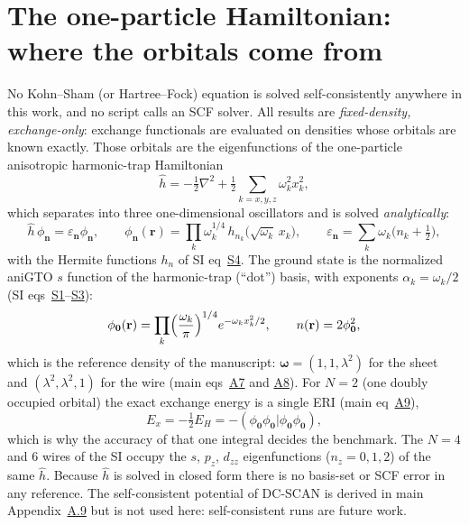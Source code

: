 \documentclass[11pt]{article}
\begin{document}
\section{The one-particle Hamiltonian: where the orbitals come from}
\label{n:sec:hamiltonian}
No Kohn--Sham (or Hartree--Fock) equation is solved self-consistently anywhere in this work, and no
script calls an SCF solver.  All results are \emph{fixed-density, exchange-only}: exchange functionals are
evaluated on densities whose orbitals are known exactly.  Those orbitals are the eigenfunctions of the
one-particle anisotropic harmonic-trap Hamiltonian
\begin{equation}
\hat h=-\tfrac12\nabla^2+\tfrac12\sum_{k=x,y,z}\omega_k^2x_k^2 ,
\label{n:h}
\end{equation}
which separates into three one-dimensional oscillators and is solved \emph{analytically}:
\begin{equation}
\hat h\,\phi_{\mathbf n}=\varepsilon_{\mathbf n}\phi_{\mathbf n},\qquad
\phi_{\mathbf n}(\mathbf r)=\prod_k\omega_k^{1/4}\,h_{n_k}\!\bigl(\sqrt{\omega_k}\,x_k\bigr),\qquad
\varepsilon_{\mathbf n}=\sum_k\omega_k\bigl(n_k+\tfrac12\bigr),
\label{n:h-eig}
\end{equation}
with the Hermite functions $h_n$ of SI eq~\href{si.pdf\#equation.4}{S4}.  The ground state is the normalized aniGTO
$s$ function of the harmonic-trap (``dot'') basis, with exponents $\alpha_k=\omega_k/2$ (SI
eqs~\href{si.pdf\#equation.1}{S1}--\href{si.pdf\#equation.3}{S3}):
\begin{equation}
\phi_{\mathbf 0}(\mathbf r)=\prod_k\Bigl(\frac{\omega_k}{\pi}\Bigr)^{1/4}e^{-\omega_kx_k^2/2},\qquad
n(\mathbf r)=2\phi_{\mathbf 0}^2,
\label{n:density}
\end{equation}
which is the reference density of the manuscript: $\boldsymbol\omega=(1,1,\lambda^2)$ for the sheet and
$(\lambda^2,\lambda^2,1)$ for the wire (main eqs~\href{main.pdf\#equation.7}{A7} and \href{main.pdf\#equation.8}{A8}).  For $N=2$ (one
doubly occupied orbital) the exact exchange energy is a single ERI (main eq~\href{main.pdf\#equation.9}{A9}),
\begin{equation}
E_x=-\tfrac12E_H=-(\phi_{\mathbf 0}\phi_{\mathbf 0}|\phi_{\mathbf 0}\phi_{\mathbf 0}),
\label{n:ex}
\end{equation}
which is why the accuracy of that one integral decides the benchmark.  The $N=4$ and 6 wires of the SI occupy
the $s$, $p_z$, $d_{zz}$ eigenfunctions ($n_z=0,1,2$) of the same $\hat h$.  Because $\hat h$ is solved in
closed form there is no basis-set or SCF error in any reference.  The self-consistent potential of DC-SCAN is
derived in main Appendix~\href{main.pdf\#subsection.A.9}{A.9} but is not used here: self-consistent runs are future work.
\end{document}
